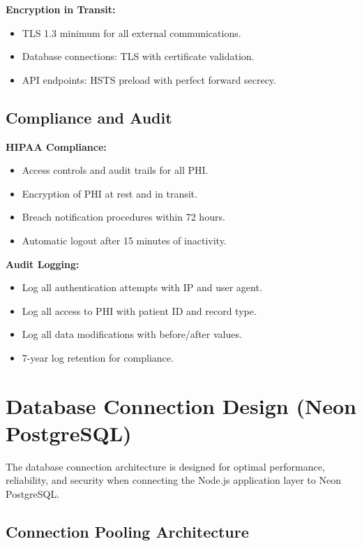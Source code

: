 \textbf{Encryption in Transit:}
\begin{itemize}
    \item TLS 1.3 minimum for all external communications.
    \item Database connections: TLS with certificate validation.
    \item API endpoints: HSTS preload with perfect forward secrecy.
\end{itemize}

\subsection{Compliance and Audit}

\textbf{HIPAA Compliance:}
\begin{itemize}
    \item Access controls and audit trails for all PHI.
    \item Encryption of PHI at rest and in transit.
    \item Breach notification procedures within 72 hours.
    \item Automatic logout after 15 minutes of inactivity.
\end{itemize}

\textbf{Audit Logging:}
\begin{itemize}
    \item Log all authentication attempts with IP and user agent.
    \item Log all access to PHI with patient ID and record type.
    \item Log all data modifications with before/after values.
    \item 7-year log retention for compliance.
\end{itemize}


\section{Database Connection Design (Neon PostgreSQL)}

\justifying
The database connection architecture is designed for optimal performance, reliability,
and security when connecting the Node.js application layer to Neon PostgreSQL.

\subsection{Connection Pooling Architecture}

